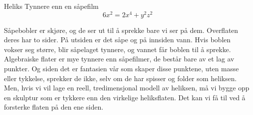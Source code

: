 \begin{surferPage}{Heliks}
Tynnere enn en såpefilm\\
  \smallskip
\[6x^2	= 2x^4	+ y^2	z^2\]

\singlespacing
Såpebobler er skjøre, og de ser ut til å sprekke bare vi ser på dem. Overflaten deres har to sider. På utsiden er det såpe og på innsiden vann. Hvis boblen vokser seg større, blir såpelaget tynnere, og vannet får boblen til å sprekke. \\
\vspace{0,3cm}
Algebraiske flater er mye tynnere enn såpefilmer, de består bare av et lag av punkter. Og siden det er fantasien vår som skaper disse punktene, uten masse eller tykkelse, sprekker de ikke, selv om de har spisser og folder som heliksen.\\
\vspace{0,3cm}
Men, hvis vi vil lage en reell, tredimensjonal modell av heliksen, må vi bygge opp en skulptur som er tykkere enn den virkelige heliksflaten. Det kan vi få til ved å forsterke flaten på den ene siden.
\end{surferPage}
